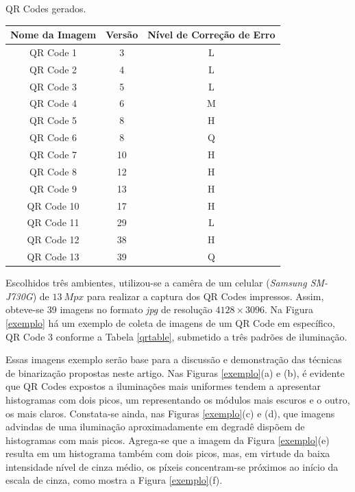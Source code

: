 \documentclass{ceel}
\begin{document}
\begin{multicols}{2}
\vspace{0.2cm}
\begin{minipage}[h]{\columnwidth}
\begin{scriptsize}
    \def\arraystretch{1.35}
    \captionsetup{type=table}
    \begin{center}
    \caption{QR Codes gerados.} \label{qrtable}
    \vspace{-0.2cm}
    \begin{tabular}{ c  c   c} \hline
    \textbf{Nome da Imagem}&  \textbf{Versão}&  \textbf{Nível de Correção de Erro}\\\hline
    QR Code 1  & 3 & L \\
    QR Code 2  & 4 & L \\
    QR Code 3  & 5 & L \\
    QR Code 4  & 6 & M \\
    QR Code 5  & 8 & H  \\
    QR Code 6  & 8 & Q  \\
    QR Code 7  & 10 & H  \\
    QR Code 8  & 12 & H  \\
    QR Code 9  & 13 & H  \\
    QR Code 10 & 17 & H  \\
    QR Code 11 & 29 & L  \\
    QR Code 12 & 38 & H \\
    QR Code 13 & 39 & Q \\\hline
    \end{tabular}
    \end{center}
\end{scriptsize}
\end{minipage}
\vspace{0.5cm}

Escolhidos três ambientes, utilizou-se a camêra de um celular (\emph{Samsung SM-J730G}) de $13\ Mpx$ para realizar a captura dos QR Codes impressos. Assim, obteve-se 39 imagens no formato \emph{jpg} de resolução  $4128 \times 3096$. 
Na Figura \ref{exemplo} há um exemplo de coleta de imagens de um QR Code em específico, QR Code 3 conforme a Tabela \ref{qrtable}, submetido a três padrões de iluminação. 

Essas imagens exemplo serão base para a discussão e demonstração das técnicas de binarização propostas neste artigo. Nas Figuras \ref{exemplo}(a) e (b), é evidente que QR Codes expostos a iluminações mais uniformes tendem a apresentar histogramas com dois picos, um representando os módulos mais escuros e o outro, os mais claros. Constata-se ainda, nas Figuras \ref{exemplo}(c) e (d), que imagens advindas de uma iluminação aproximadamente em degradê dispõem de histogramas com mais picos. Agrega-se que a imagem da Figura \ref{exemplo}(e) resulta em um histograma também com dois picos, mas, em virtude da baixa intensidade nível de cinza médio, os píxeis concentram-se próximos ao início da escala de cinza, como mostra a Figura \ref{exemplo}(f).



\end{multicols}
\end{document}

